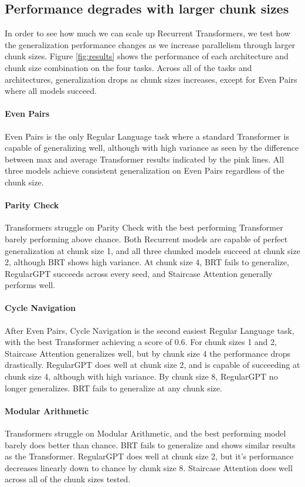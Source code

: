     \subsection{Performance degrades with larger chunk sizes}
    In order to see how much we can scale up Recurrent Transformers, we test how the generalization performance changes as we increase parallelism through larger chunk sizes. Figure \ref{fig:results} shows the performance of each architecture and chunk size combination on the four tasks. Across all of the tasks and architectures, generalization drops as chunk sizes increases, except for Even Pairs where all models succeed.
    
    \paragraph{Even Pairs} Even Pairs is the only Regular Language task where a standard Transformer is capable of generalizing well, although with high variance as seen by the difference between max and average Transformer results indicated by the pink lines. All three models achieve consistent generalization on Even Pairs regardless of the chunk size. 
    
    \paragraph{Parity Check} Transformers struggle on Parity Check with the best performing Transformer barely performing above chance. Both Recurrent models are capable of perfect generalization at chunk size 1, and all three chunked models succeed at chunk size 2, although BRT shows high variance. At chunk size 4, BRT fails to generalize, RegularGPT succeeds across every seed, and Staircase Attention generally performs well. 
    
    \paragraph{Cycle Navigation} After Even Pairs, Cycle Navigation is the second easiest Regular Language task, with the best Transformer achieving a score of 0.6. For chunk sizes 1 and 2, Staircase Attention generalizes well, but by chunk size 4 the performance drops drastically. RegularGPT does well at chunk size 2, and is capable of succeeding at chunk size 4, although with high variance. By chunk size 8, RegularGPT no longer generalizes. BRT fails to generalize at any chunk size.
    
    \paragraph{Modular Arithmetic} Transformers struggle on Modular Arithmetic, and the best performing model barely does better than chance. BRT fails to generalize and shows similar results as the Transformer. RegularGPT does well at chunk size 2, but it's performance decreases linearly down to chance by chunk size 8. Staircase Attention does well across all of the chunk sizes tested.
    

